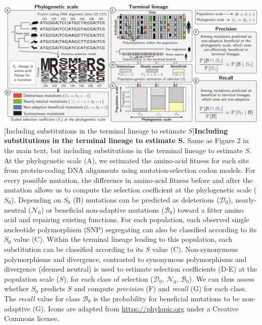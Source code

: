 \documentclass{article}
\newcommand{\Sphy}{S_{0}}
\newcommand{\SphyDel}{\mathcal{D}_0}
\newcommand{\SphyNeu}{\mathcal{N}_0}
\newcommand{\SphyBen}{\mathcal{B}_0}
\newcommand{\Spop}{S}
\begin{document}
    \begin{center}
            \includegraphics[width=\textwidth, page=1] {artworks/figure.method.proba.div.pdf}
            [Including substitutions in the terminal lineage to estimate $\Spop$]{\textbf{Including substitutions in the terminal lineage to estimate $\bm{\Spop}$.} Same as Figure 2 in the main text, but including substitutions in the terminal lineage to estimate $\Spop$.
            At the phylogenetic scale (A), we estimated the amino-acid fitness for each site from protein-coding DNA alignments using mutation-selection codon models.
            For every possible mutation, the difference in amino-acid fitness before and after the mutation allows us to compute the selection coefficient at the phylogenetic scale ($\Sphy$).
            Depending on $\Sphy$ (B) mutations can be predicted as deleterious ($\SphyDel$), nearly-neutral ($\SphyNeu$) or beneficial non-adaptive mutations ($\SphyBen$) toward a fitter amino acid and repairing existing functions.
            For each population, each observed single nucleotide polymorphism (SNP) segregating can also be classified according to its $\Sphy$ value (C).
            Within the terminal lineage leading to this population, each substitution can be classified according to its $\Spop$ value (C).
            Non-synonymous polymorphisms and divergence, contrasted to synonymous polymorphisms and divergence (deemed neutral) is used to estimate selection coefficients (D-E) at the population scale ($\Spop$), for each class of selection ($\SphyDel$, $\SphyNeu$, $\SphyBen$).
            We can thus assess whether $\Sphy$ predicts $\Spop$ and compute \textit{precision} (F) and \textit{recall} (G) for each class.
            The \textit{recall} value for class $\SphyBen$ is the probability for beneficial mutations to be non-adaptive (G).
            Icons are adapted from \href{https://phylopic.org}{https://phylopic.org} under a Creative Commons license.
            \label{fig-incdiv}
            }
    \end{center}
\end{document}
